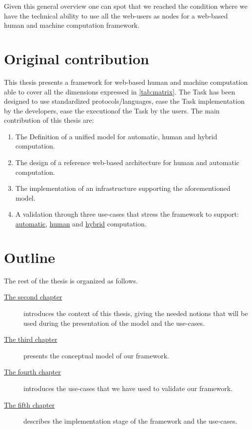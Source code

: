 Given this general overview one can spot that we reached the condition where we
have the technical ability to use all the web-users as nodes for a web-based human
and machine computation framework.

\section{Original contribution}
This thesis presents a framework for web-based human and machine
computation able to cover all the dimensions expressed in \autoref{tab:matrix}.
The Task has been designed to use standardized protocols/languages, ease the
Task implementation by the developers, ease the executionof the Task by the users.
The main contribution of this thesis are:
\begin{enumerate}
	\item The Definition of a unified model for automatic, human and hybrid
	computation.
	\item The design of a reference web-based architecture for human and
	automatic computation.
	\item The implementation of an infrastructure supporting the aforementioned model.
	\item A validation through three use-cases that stress the framework to support:
	\hyperref[sec:cases:automatic]{automatic}, \hyperref[sec:cases:human]{human}
	and \hyperref[sec:cases:hybrid]{hybrid} computation.
\end{enumerate}







\section{Outline}
The rest of the thesis is organized as follows.
\begin{description}
	\item[{\hyperref[cap:bg]{The second chapter}}] introduces the context of this
	thesis, giving the needed notions that will be used during the presentation
	of the model and the use-cases.

	\item[{\hyperref[cap:model]{The third chapter}}] presents the conceptual model
	of our framework.

	\item[{\hyperref[cap:cases]{The fourth chapter}}] introduces the use-cases
	that we have used to validate our framework.

	\item[{\hyperref[cap:implementation]{The fifth chapter}}] describes the
	implementation stage of the framework and the use-cases.
\end{description}